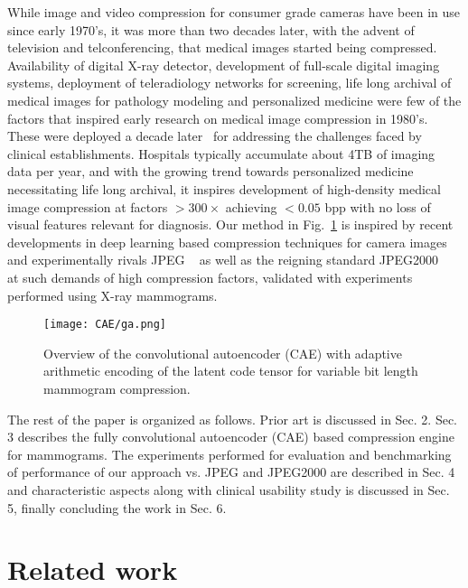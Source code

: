 \documentclass[10pt,twocolumn,letterpaper]{article}
\begin{document}
While image and video compression for consumer grade cameras have been in use since early 1970's, it was more than two decades later, with the advent of television and telconferencing, that medical images started being compressed. Availability of digital X-ray detector, development of full-scale digital imaging systems, deployment of teleradiology networks for screening, life long archival of medical images for pathology modeling and personalized medicine were few of the factors that inspired early research on medical image compression in 1980's. These were deployed a decade later~\cite{kuduvalli1992performance} for addressing the challenges faced by clinical establishments. Hospitals typically accumulate about 4TB of imaging data per year, and with the growing trend towards personalized medicine necessitating life long archival, it inspires development of high-density medical image compression at factors $>300\times$ achieving $<0.05$ bpp with no loss of visual features relevant for diagnosis. Our method in Fig.~\ref{graphicalabstract} is inspired by recent developments in deep learning based compression techniques for camera images~\cite{toderici2016full, johnston2017improved, theis2017lossy, rippel2017real} and experimentally rivals JPEG ~\cite{wallace1992jpeg} as well as the reigning standard JPEG2000 ~\cite{skodras2001jpeg} at such demands of high compression factors, validated with experiments performed using X-ray mammograms.

\begin{figure}[t]
    \centering
       \texttt{[image: CAE/ga.png]}
  \caption{Overview of the convolutional autoencoder (CAE) with adaptive arithmetic encoding of the latent code tensor for variable bit length mammogram compression.}
  \label{graphicalabstract} 
\end{figure}

The rest of the paper is organized as follows. Prior art is discussed in Sec. 2. Sec. 3 describes the fully convolutional autoencoder (CAE) based compression engine for mammograms. The experiments performed for evaluation and benchmarking of performance of our approach vs. JPEG and JPEG2000 are described in Sec. 4 and characteristic aspects along with clinical usability study is discussed in Sec. 5, finally concluding the work in Sec. 6.

\section{Related work}
\end{document}
